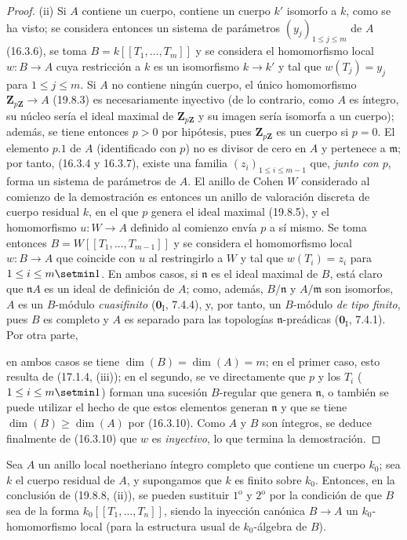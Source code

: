 \begin{proof}
\medskip
\noindent(ii)\enspace
Si $A$ contiene un cuerpo, contiene un cuerpo $k'$ isomorfo a $k$, como se ha
visto; se considera entonces un sistema de parámetros
$(y_j)_{1\leq j\leq m}$ de $A$ (16.3.6), se toma
$B=k[[T_1,\ldots,T_m]]$ y se considera el homomorfismo local $w:B\to A$ cuya
restricción a $k$ es un isomorfismo $k\to k'$ y tal que
$w(T_j)=y_j$ para $1\leq j\leq m$. Si $A$ no contiene ningún cuerpo, el único
homomorfismo $\mathbf Z_{p\mathbf Z}\to A$ (19.8.3) es necesariamente
inyectivo (de lo contrario, como $A$ es íntegro, su núcleo sería el ideal
maximal de $\mathbf Z_{p\mathbf Z}$ y su imagen sería isomorfa a un cuerpo);
además, se tiene entonces $p>0$ por hipótesis, pues
$\mathbf Z_{p\mathbf Z}$ es un cuerpo si $p=0$. El elemento $p.1$ de $A$
(identificado con $p$) no es divisor de cero en $A$ y pertenece a
$\mathfrak m$; por tanto, (16.3.4 y 16.3.7), existe una familia
$(z_i)_{1\leq i\leq m-1}$ que, \emph{junto con $p$}, forma un sistema de parámetros
de $A$. El anillo de Cohen $W$ considerado al comienzo de la demostración es
entonces un anillo de valoración discreta de cuerpo residual $k$, en el que
$p$ genera el ideal maximal (19.8.5), y el homomorfismo $u:W\to A$
definido al comienzo envía $p$ a sí mismo. Se toma entonces
$B=W[[T_1,\ldots,T_{m-1}]]$ y se considera el homomorfismo local $w:B\to A$
que coincide con $u$ al restringirlo a $W$ y tal que $w(T_i)=z_i$ para
$1\leq i\leq m\setmin 1$. En ambos casos, si $\mathfrak n$ es el ideal maximal de
$B$, está claro que $\mathfrak nA$ es un ideal de definición de $A$; como,
además, $B/\mathfrak n$ y $A/\mathfrak m$ son isomorfos, $A$ es un
$B$-módulo \emph{cuasifinito} ($\mathbf 0_{\mathrm I}$, 7.4.4), y, por tanto, un
$B$-módulo \emph{de tipo finito}, pues $B$ es completo y $A$ es
separado para las topologías $\mathfrak n$-preádicas
($\mathbf 0_{\mathrm I}$, 7.4.1). Por otra
parte,


en ambos casos se tiene $\dim(B)=\dim(A)=m$; en el primer caso, esto resulta
de (17.1.4, (iii)); en el segundo, se ve directamente que $p$ y los $T_i$
($1\leq i\leq m\setmin 1$) forman una sucesión $B$-regular que genera $\mathfrak n$,
o también se puede utilizar el hecho de que estos elementos generan
$\mathfrak n$ y que se tiene $\dim(B)\geq\dim(A)$ por (16.3.10). Como $A$ y
$B$ son íntegros, se deduce finalmente de (16.3.10) que $w$ es \emph{inyectivo}, lo
que termina la demostración.
\end{proof}

\begin{corollary}[19.8.9]
\label{0.19.8.9-fr}
Sea $A$ un anillo local noetheriano íntegro completo que contiene un cuerpo
$k_0$; sea $k$ el cuerpo residual de $A$, y supongamos que $k$ es finito sobre
$k_0$. Entonces, en la conclusión de \textup{(19.8.8, (ii))}, se pueden sustituir
$1^{\mathrm o}$ y $2^{\mathrm o}$ por la condición de que $B$ sea de la forma
$k_0[[T_1,\ldots,T_n]]$, siendo la inyección canónica $B\to A$ un
$k_0$-homomorfismo local (para la estructura usual de $k_0$-álgebra de $B$).
\end{corollary}

